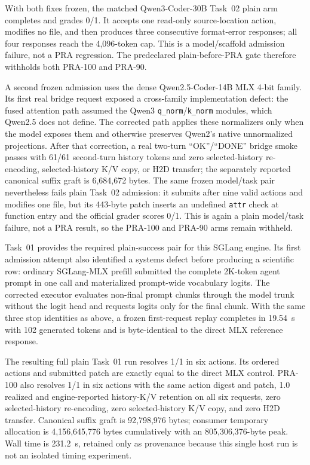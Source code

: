 \documentclass[11pt]{article}
\begin{document}
With both fixes frozen, the matched Qwen3-Coder-30B Task~02 plain arm completes
and grades 0/1.  It accepts one read-only source-location action, modifies no
file, and then produces three consecutive format-error responses; all four
responses reach the 4,096-token cap.  This is a model/scaffold admission failure,
not a PRA regression.  The predeclared plain-before-PRA gate therefore withholds
both PRA-100 and PRA-90.

A second frozen admission uses the dense Qwen2.5-Coder-14B MLX 4-bit family.
Its first real bridge request exposed a cross-family implementation defect:
the fused attention path assumed the Qwen3 \texttt{q\_norm}/\texttt{k\_norm}
modules, which Qwen2.5 does not define.  The corrected path applies these
normalizers only when the model exposes them and otherwise preserves Qwen2's
native unnormalized projections.  After that correction, a real two-turn
``OK''/``DONE'' bridge smoke passes with 61/61 second-turn history tokens and
zero selected-history re-encoding, selected-history K/V copy, or H2D transfer;
the separately reported canonical suffix graft is 6,684,672 bytes.  The same
frozen model/task pair nevertheless fails plain Task~02 admission: it submits
after nine valid actions and modifies one file, but its 443-byte patch inserts
an undefined \texttt{attr} check at function entry and the official grader
scores 0/1.  This is again a plain model/task failure, not a PRA result, so the
PRA-100 and PRA-90 arms remain withheld.

Task~01 provides the required plain-success pair for this SGLang engine.  Its
first admission attempt also identified a systems defect before producing a
scientific row: ordinary SGLang-MLX prefill submitted the complete 2K-token
agent prompt in one call and materialized prompt-wide vocabulary logits.  The
corrected executor evaluates non-final prompt chunks through the model trunk
without the logit head and requests logits only for the final chunk.  With the
same three stop identities as above, a frozen first-request replay completes in
19.54~s with 102 generated tokens and is byte-identical to the direct MLX
reference response.

The resulting full plain Task~01 run resolves 1/1 in six actions.  Its ordered
actions and submitted patch are exactly equal to the direct MLX control.
PRA-100 also resolves 1/1 in six actions with the same action digest and patch,
1.0 realized and engine-reported history-K/V retention on all six requests,
zero selected-history re-encoding, zero selected-history K/V copy, and zero
H2D transfer.  Canonical suffix graft is 92,798,976 bytes; consumer temporary
allocation is 4,156,645,776 bytes cumulatively with an 805,306,376-byte peak.
Wall time is 231.2~s, retained only as provenance because this single host run
is not an isolated timing experiment.
\end{document}
